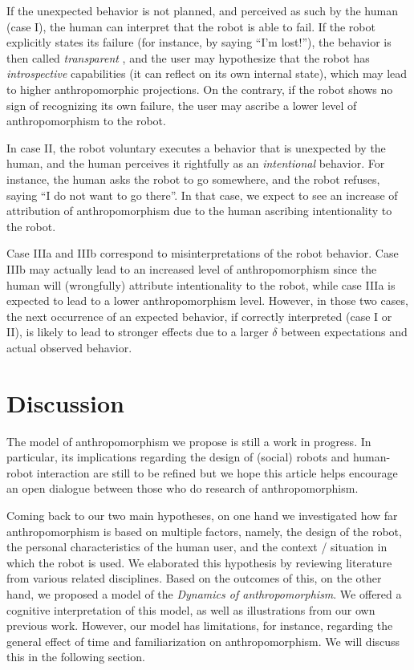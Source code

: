 \documentclass{frontiersSCNS} %
\begin{document}
If the unexpected behavior is not planned, and perceived as such by the human
(case I), the human can interpret that the robot is able to fail. If the robot
explicitly states its failure (for instance, by saying ``I'm lost!''), the
behavior is then called \emph{transparent} \citep{kim_who_2006}, and the user
may hypothesize that the robot has \emph{introspective} capabilities (it can
reflect on its own internal state), which may lead to higher anthropomorphic
projections.  On the contrary, if the robot shows no sign of recognizing its own
failure, the user may ascribe a lower level of anthropomorphism to the robot.

In case II, the robot voluntary executes a behavior that is unexpected by the
human, and the human perceives it rightfully as an \emph{intentional} behavior.
For instance, the human asks the robot to go somewhere, and the robot refuses,
saying ``I do not want to go there''. In that case, we expect to see an increase
of attribution of anthropomorphism due to the human ascribing intentionality to
the robot.

Case IIIa and IIIb correspond to misinterpretations of the robot behavior. Case
IIIb may actually lead to an increased level of anthropomorphism since the human
will (wrongfully) attribute intentionality to the robot, while case IIIa is
expected to lead to a lower anthropomorphism level.  However, in those two
cases, the next occurrence of an expected behavior, if correctly interpreted
(case I or II), is likely to lead to stronger effects due to a larger $\delta$
between expectations and actual observed behavior. 

%
%
%
%
%
%

\section{Discussion}
\label{sec:discussion}

The model of anthropomorphism we propose is still a work in progress. In
particular, its implications regarding the design of (social) robots and
human-robot interaction are still to be refined but we hope this article helps
encourage an open dialogue between those who do research of anthropomorphism.

Coming back to our two main hypotheses, on one hand we investigated how far
anthropomorphism is based on multiple factors, namely, the design of the robot,
the personal characteristics of the human user, and the context / situation in
which the robot is used.  We elaborated this hypothesis by reviewing literature
from various related disciplines. Based on the outcomes of this, on the other
hand, we proposed a model of the \emph{Dynamics of anthropomorphism}. We offered
a cognitive interpretation of this model, as well as illustrations from our own
previous work.  However, our model has limitations, for instance, regarding the
general effect of time and familiarization on anthropomorphism. We will discuss
this in the following section.
\end{document}

